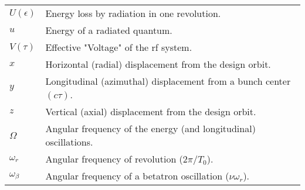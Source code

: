 \begin{tabularx}{\linewidth}{@{}lX@{}}
	$U(\epsilon)$ & Energy loss by radiation in one revolution.\\
	$u$			& Energy of a radiated quantum.\\
	$V(\tau)$	& Effective "Voltage" of the rf system.\\
	$x$			& Horizontal (radial) displacement from the design orbit.\\
	$y$			& Longitudinal (azimuthal) displacement from a bunch center $(c\tau)$.\\
    $z$			& Vertical (axial) displacement from the design orbit.\\
    $\Omega$	& Angular frequency of the energy (and longitudinal) oscillations.\\
    $\omega_r$	& Angular frequency of revolution ($2\pi/T_0$).\\
	$\omega_\beta$ & Angular frequency of a betatron oscillation ($\nu\omega_r$).
\end{tabularx}
